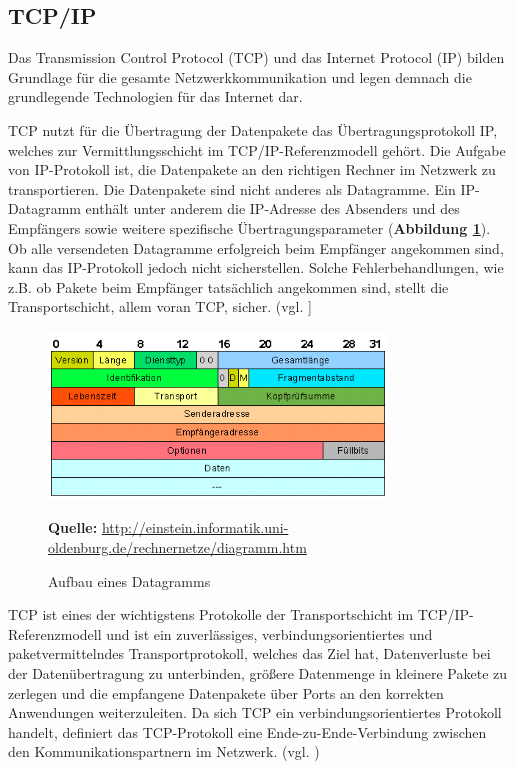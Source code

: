 \newpage
\subsection{TCP/IP}
\label{sec:tcp/ip}
Das Transmission Control Protocol (TCP) und das Internet Protocol (IP) bilden Grundlage für die gesamte Netzwerkkommunikation und legen demnach die grundlegende Technologien für das Internet dar.\bigskip

TCP nutzt für die Übertragung der Datenpakete das Übertragungsprotokoll IP, welches zur Vermittlungsschicht im TCP/IP-Referenzmodell gehört. Die Aufgabe von IP-Protokoll ist, die Datenpakete an den richtigen Rechner im Netzwerk zu transportieren. Die Datenpakete sind nicht anderes als Datagramme. Ein IP-Datagramm enthält unter anderem die IP-Adresse des Absenders und des Empfängers sowie weitere spezifische Übertragungsparameter (\textbf {Abbildung \ref{fig:datagramms}}). Ob alle versendeten Datagramme erfolgreich beim Empfänger angekommen sind, kann das IP-Protokoll jedoch nicht sicherstellen. Solche Fehlerbehandlungen, wie z.B. ob Pakete beim Empfänger tatsächlich angekommen sind, stellt die Transportschicht, allem voran TCP, sicher. (vgl. \cite{Kar.o.J.}] 

\begin{figure}[H]
  \begin{center}
    \includegraphics[width=9cm]{img/Datagramms.png}
	\caption{Aufbau eines Datagramms}
	\footnotesize\sffamily\textbf{Quelle:} \url{http://einstein.informatik.uni-oldenburg.de/rechnernetze/diagramm.htm} 
	\label{fig:datagramms}
  \end{center}   
\end{figure}

TCP ist eines der wichtigstens Protokolle der Transportschicht im TCP/IP-Referenzmodell und ist ein zuverlässiges, verbindungsorientiertes und paketvermittelndes Transportprotokoll, welches das Ziel hat, Datenverluste bei der Datenübertragung zu unterbinden, größere Datenmenge in kleinere Pakete zu zerlegen und die empfangene Datenpakete über Ports an den korrekten Anwendungen weiterzuleiten. Da sich TCP ein verbindungsorientiertes Protokoll handelt, definiert das TCP-Protokoll eine Ende-zu-Ende-Verbindung zwischen den Kommunikationspartnern im Netzwerk. (vgl. \cite{o.V.2019})\bigskip


